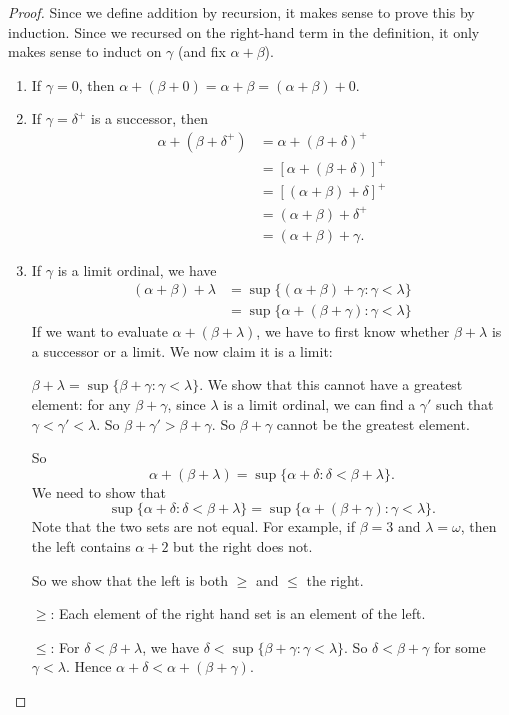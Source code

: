 \documentclass[a4paper]{article}
\begin{document}
\begin{proof}
  Since we define addition by recursion, it makes sense to prove this by induction. Since we recursed on the right-hand term in the definition, it only makes sense to induct on $\gamma$ (and fix $\alpha + \beta$).

  \begin{enumerate}
    \item If $\gamma = 0$, then $\alpha + (\beta + 0) = \alpha + \beta = (\alpha + \beta) + 0$.
    \item If $\gamma = \delta^+$ is a successor, then
      \begin{align*}
        \alpha + (\beta + \delta^+) &= \alpha + (\beta + \delta)^+\\
        &= [\alpha + (\beta + \delta)]^+\\
        &= [(\alpha + \beta) + \delta]^+\\
        &= (\alpha + \beta) + \delta^+\\
        &= (\alpha + \beta) + \gamma.
      \end{align*}
    \item If $\gamma$ is a limit ordinal, we have
      \begin{align*}
        (\alpha + \beta) + \lambda &= \sup\{(\alpha + \beta) + \gamma: \gamma < \lambda\}\\
        &= \sup\{\alpha + (\beta + \gamma): \gamma < \lambda\}
      \end{align*}
      If we want to evaluate $\alpha + (\beta + \lambda)$, we have to first know whether $\beta + \lambda$ is a successor or a limit. We now claim it is a limit:

      $\beta + \lambda = \sup\{\beta + \gamma: \gamma < \lambda\}$. We show that this cannot have a greatest element: for any $\beta + \gamma$, since $\lambda$ is a limit ordinal, we can find a $\gamma'$ such that $\gamma < \gamma' < \lambda$. So $\beta + \gamma' > \beta + \gamma$. So $\beta + \gamma$ cannot be the greatest element.

      So
      \[
        \alpha + (\beta + \lambda) = \sup\{\alpha + \delta: \delta < \beta + \lambda\}.
      \]
      We need to show that
      \[
        \sup\{\alpha + \delta: \delta < \beta + \lambda\} = \sup\{\alpha + (\beta + \gamma): \gamma < \lambda\}.
      \]
      Note that the two sets are not equal. For example, if $\beta = 3$ and $\lambda = \omega$, then the left contains $\alpha + 2$ but the right does not.

      So we show that the left is both $\geq$ and $\leq$ the right.

      $\geq$: Each element of the right hand set is an element of the left.

      $\leq$: For $\delta < \beta + \lambda$, we have $\delta < \sup \{\beta + \gamma: \gamma < \lambda\}$. So $\delta < \beta + \gamma$ for some $\gamma < \lambda$. Hence $\alpha + \delta < \alpha + (\beta + \gamma)$.\qedhere
  \end{enumerate}
\end{proof}
\end{document}
